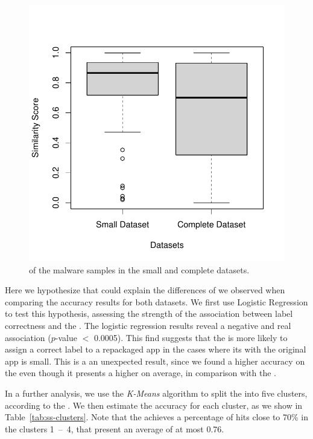 \begin{figure}
  \includegraphics[width=\columnwidth]{images/similarity-1.pdf}
  \caption{\sscore of the malware samples in the small and complete datasets.}
  \label{fig:ss}
\end{figure}

Here we hypothesize that \sscore could explain
the differences of \mas we observed
when comparing the accuracy results for both
datasets. We first use Logistic Regression to test this hypothesis,
assessing the strength of the association between label correctness and
the \sscore. The logistic regression results reveal
a negative and real association ($p$-value $<$ 0.0005). This find suggests
that the \mas is more likely to assign a correct label to
a repackaged app in the cases where its \sscore with the original
app is small. This is a an unexpected result, since
we found a higher accuracy on the \sds even though
it presents a higher \sscore on average, in comparison with the \cds. 

In a further analysis, we use the \emph{K-Means} algorithm to split the
\cds into five clusters, according to the \sscore. We then
estimate the accuracy for each cluster, as
we show in Table~\ref{tab:ss-clusters}. Note that the \mas
achieves a percentage of hits close to 70\% in the clusters 1~--~4, that present an average \sscore of at most 0.76.

